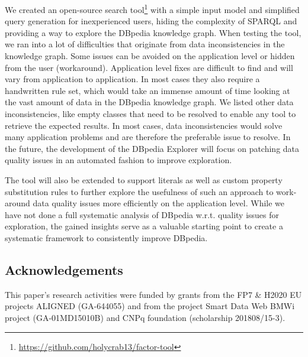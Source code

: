 \documentclass{sig-alternate}
\begin{document}
We created an open-source search tool\footnote{\url{https://github.com/holycrab13/factor-tool}} with a simple input model and simpliﬁed query generation for inexperienced users, hiding the complexity of SPARQL and providing a way to explore the DBpedia knowledge graph. When testing the tool, we ran into a lot of diﬃculties that originate from data inconsistencies in the knowledge graph. Some issues can be avoided on the application level or hidden from the user (workaround). Application level ﬁxes are diﬃcult to ﬁnd and will vary from application to application. In most cases they also require a handwritten rule set, which would take an immense amount of time looking at the vast amount of data in the DBpedia knowledge graph. We listed other data inconsistencies, like empty classes that need to be resolved to enable any tool to retrieve the expected results. In most cases, data inconsistencies would solve many application problems and are therefore the preferable issue to resolve. In the future, the development of the DBpedia Explorer will focus on patching data quality issues in an automated fashion to improve exploration.

The tool will also be extended to support literals as well as custom property substitution rules to further explore the usefulness of such an approach to work-around data quality issues more eﬃciently on the application level. While we have not done a full systematic analysis of DBpedia w.r.t. quality issues for exploration, the gained insights serve as a valuable starting point to create a systematic framework to consistently improve DBpedia.

\subsection*{Acknowledgements}This paper's research activities were funded by grants from the FP7 \& H2020 EU projects ALIGNED (GA-644055) and from the project Smart Data Web BMWi project (GA-01MD15010B) and CNPq foundation (scholarship 201808/15-3).
\end{document}

